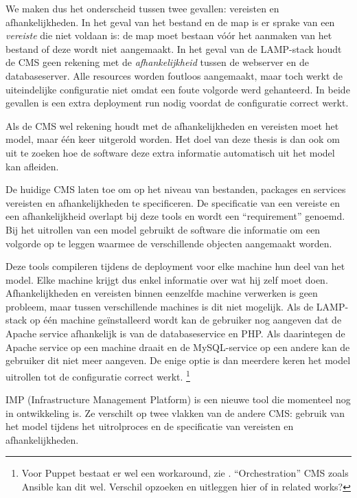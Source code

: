 We maken dus het onderscheid tussen twee gevallen: vereisten en afhankelijkheden.
In het geval van het bestand en de map is er sprake van een \textit{vereiste} die niet voldaan is: de map moet bestaan v\'o\'or het aanmaken van het bestand of deze wordt niet aangemaakt.
In het geval van de LAMP-stack houdt de CMS geen rekening met de \textit{afhankelijkheid} tussen de webserver en de databaseserver.
Alle resources worden foutloos aangemaakt, maar toch werkt de uiteindelijke configuratie niet omdat een foute volgorde werd gehanteerd.
In beide gevallen is een extra deployment run nodig voordat de configuratie correct werkt.

Als de CMS wel rekening houdt met de afhankelijkheden en vereisten moet het model, maar \'e\'en keer uitgerold worden.
Het doel van deze thesis is dan ook om uit te zoeken hoe de software deze extra informatie automatisch uit het model kan afleiden.

De huidige CMS laten toe om op het niveau van bestanden, packages en services vereisten en afhankelijkheden te specificeren.
De specificatie van een vereiste en een afhankelijkheid overlapt bij deze tools en wordt een ``requirement'' genoemd.
Bij het uitrollen van een model gebruikt de software die informatie om een volgorde op te leggen waarmee de verschillende objecten aangemaakt worden.

Deze tools compileren tijdens de deployment voor elke machine hun deel van het model.
Elke machine krijgt dus enkel informatie over wat hij zelf moet doen.
Afhankelijkheden en vereisten binnen eenzelfde machine verwerken is geen probleem, maar tussen verschillende machines is dit niet mogelijk.
Als de LAMP-stack op \'e\'en machine ge\"installeerd wordt kan de gebruiker nog aangeven dat de Apache service afhankelijk is van de databaseservice en PHP.
Als daarintegen de Apache service op een machine draait en de MySQL-service op een andere kan de gebruiker dit niet meer aangeven.
De enige optie is dan meerdere keren het model uitrollen tot de configuratie correct werkt.
\footnote{Voor Puppet bestaat er wel een workaround, zie \cite{puppet-orchestration}. ``Orchestration'' CMS zoals Ansible kan dit wel.  Verschil opzoeken en uitleggen hier of in related works?}

IMP (Infrastructure Management Platform) is een nieuwe tool die momenteel nog in ontwikkeling is.
Ze verschilt op twee vlakken van de andere CMS: gebruik van het model tijdens het uitrolproces en de specificatie van vereisten en afhankelijkheden.%

